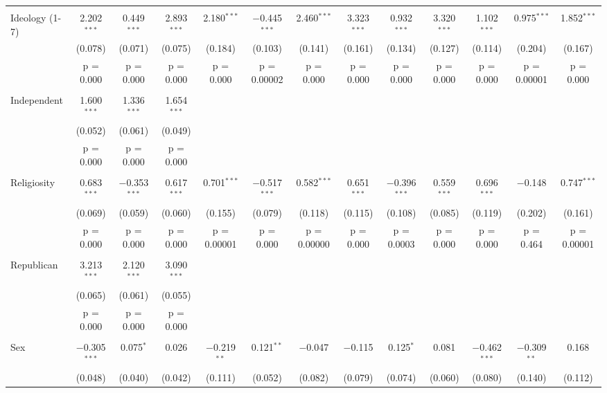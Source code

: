 \begin{longtable}{@{\extracolsep{5pt}}lcccccccccccc}
  & & & & & & & & & & & & \\ 
 Ideology (1-7) & 2.202$^{***}$ & 0.449$^{***}$ & 2.893$^{***}$ & 2.180$^{***}$ & $-$0.445$^{***}$ & 2.460$^{***}$ & 3.323$^{***}$ & 0.932$^{***}$ & 3.320$^{***}$ & 1.102$^{***}$ & 0.975$^{***}$ & 1.852$^{***}$ \\ 
  & (0.078) & (0.071) & (0.075) & (0.184) & (0.103) & (0.141) & (0.161) & (0.134) & (0.127) & (0.114) & (0.204) & (0.167) \\ 
  & p = 0.000 & p = 0.000 & p = 0.000 & p = 0.000 & p = 0.00002 & p = 0.000 & p = 0.000 & p = 0.000 & p = 0.000 & p = 0.000 & p = 0.00001 & p = 0.000 \\ 
  & & & & & & & & & & & & \\ 
 Independent & 1.600$^{***}$ & 1.336$^{***}$ & 1.654$^{***}$ &  &  &  &  &  &  &  &  &  \\ 
  & (0.052) & (0.061) & (0.049) &  &  &  &  &  &  &  &  &  \\ 
  & p = 0.000 & p = 0.000 & p = 0.000 &  &  &  &  &  &  &  &  &  \\ 
  & & & & & & & & & & & & \\ 
 Religiosity & 0.683$^{***}$ & $-$0.353$^{***}$ & 0.617$^{***}$ & 0.701$^{***}$ & $-$0.517$^{***}$ & 0.582$^{***}$ & 0.651$^{***}$ & $-$0.396$^{***}$ & 0.559$^{***}$ & 0.696$^{***}$ & $-$0.148 & 0.747$^{***}$ \\ 
  & (0.069) & (0.059) & (0.060) & (0.155) & (0.079) & (0.118) & (0.115) & (0.108) & (0.085) & (0.119) & (0.202) & (0.161) \\ 
  & p = 0.000 & p = 0.000 & p = 0.000 & p = 0.00001 & p = 0.000 & p = 0.00000 & p = 0.000 & p = 0.0003 & p = 0.000 & p = 0.000 & p = 0.464 & p = 0.00001 \\ 
  & & & & & & & & & & & & \\ 
 Republican & 3.213$^{***}$ & 2.120$^{***}$ & 3.090$^{***}$ &  &  &  &  &  &  &  &  &  \\ 
  & (0.065) & (0.061) & (0.055) &  &  &  &  &  &  &  &  &  \\ 
  & p = 0.000 & p = 0.000 & p = 0.000 &  &  &  &  &  &  &  &  &  \\ 
  & & & & & & & & & & & & \\ 
 Sex & $-$0.305$^{***}$ & 0.075$^{*}$ & 0.026 & $-$0.219$^{**}$ & 0.121$^{**}$ & $-$0.047 & $-$0.115 & 0.125$^{*}$ & 0.081 & $-$0.462$^{***}$ & $-$0.309$^{**}$ & 0.168 \\ 
  & (0.048) & (0.040) & (0.042) & (0.111) & (0.052) & (0.082) & (0.079) & (0.074) & (0.060) & (0.080) & (0.140) & (0.112) \\ 

\end{longtable}
